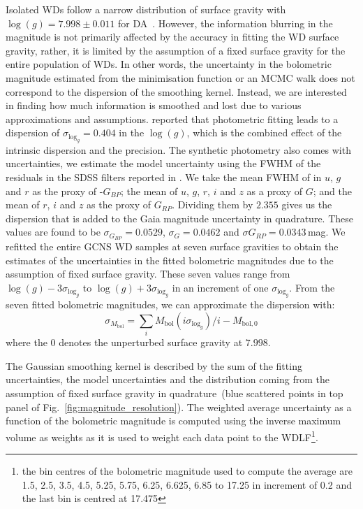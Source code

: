 \documentclass[fleqn,usenatbib]{mnras}
\begin{document}
Isolated WDs follow a narrow distribution of surface gravity with
$\log(g)=7.998 \pm 0.011$ for DA~\citep{2021MNRAS.507.4646K}. However, the
information blurring in the magnitude is not primarily affected by the accuracy
in fitting the WD surface gravity, rather, it is limited by the assumption of a
fixed surface gravity for the entire population of WDs. In other words, the
uncertainty in the bolometric magnitude estimated from the minimisation
function or an MCMC walk does not correspond to the dispersion of the
smoothing kernel. Instead, we are interested in finding how much information
is smoothed and lost due to various approximations and assumptions.
\citet{2014ApJ...796..128G} reported that photometric fitting leads to a
dispersion of $\sigma_{\mathrm{log}_{g}} = 0.404$ in the $\log(g)$, which is
the combined effect of the intrinsic dispersion and the precision. The
synthetic photometry also comes with uncertainties, we estimate the model
uncertainty using the FWHM of the residuals in the SDSS filters reported in
\citet{2006AJ....132.1221H}. We take the mean FWHM of in $u$, $g$ and $r$ as
the proxy of -$G_{BP}$; the mean of $u$, $g$, $r$, $i$ and $z$ as a proxy of
$G$; and the mean of $r$, $i$ and $z$ as the proxy of $G_{RP}$. Dividing them
by $2.355$ gives us the dispersion that is added to the Gaia magnitude
uncertainty in quadrature. These values are found to be
$\sigma_{G_{BP}}=0.0529$, $\sigma_{G}=0.0462$ and $\sigma{G_{RP}}=0.0343$\,mag.
We refitted the entire GCNS WD samples at seven surface gravities to obtain
the estimates of the uncertainties in the fitted bolometric magnitudes due to
the assumption of fixed surface gravity. These seven values range from
$\log(g) - 3\sigma_{\mathrm{log}_{g}}$ to $\log(g) + 3\sigma_{\mathrm{log}_{g}}$
in an increment of one $\sigma_{\mathrm{log}_{g}}$. From the seven fitted
bolometric magnitudes, we can approximate the dispersion with:
\begin{equation}
  \sigma_{M_{\mathrm{bol}}} = \sum_{i} M_{\mathrm{bol}}(i\sigma_{\mathrm{log}_{g}}) / i - M_{\mathrm{bol}, 0}
\end{equation}
where the $0$ denotes the unperturbed surface gravity at $7.998$.

The Gaussian smoothing kernel is described by the sum of the fitting
uncertainties, the model uncertainties and the distribution coming from the
assumption of fixed surface gravity in quadrature~(blue scattered points in top
panel of Fig.~\ref{fig:magnitude_resolution}). The weighted average uncertainty
as a function of the bolometric magnitude is computed using the inverse maximum
volume as weights as it is used to weight each data point to the WDLF\footnote{
the bin centres of the bolometric magnitude used to compute the average are
1.5,  2.5,  3.5,  4.5,  5.25,  5.75,  6.25,  6.625, 6.85 to 17.25 in increment
of 0.2 and the last bin is centred at 17.475}.
\end{document}
